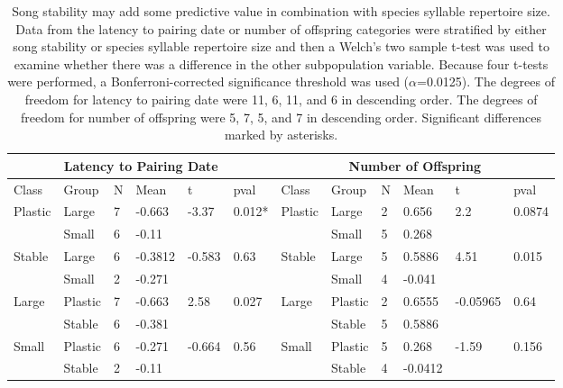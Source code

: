 \documentclass{article}
\begin{document}
\begin{table}[H]
\caption{Song stability may add some predictive value in combination with species syllable repertoire size.  Data from the latency to pairing date or number of offspring categories were stratified by either song stability or species syllable repertoire size and then a Welch's two sample t-test was used to examine whether there was a difference in the other subpopulation variable.  Because four t-tests were performed, a Bonferroni-corrected significance threshold was used ($\alpha$=0.0125).  The degrees of freedom for latency to pairing date were 11, 6, 11, and 6 in descending order.  The degrees of freedom for number of offspring were 5, 7, 5, and 7 in descending order. Significant differences marked by asterisks.}
\centering
\begin{tabular}{|llllll|llllll|}
  \hline
    \multicolumn{6}{|c|}{Latency to Pairing Date} &
  \multicolumn{6}{c|}{Number of Offspring}\\
  \hline
Class & Group & N & Mean & t & pval & Class & Group & N & Mean & t & pval \\ 
  \hline
  Plastic & Large & 7 & -0.663 & -3.37 & 0.012* & Plastic & Large & 2 & 0.656 & 2.2 & 0.0874 \\ 
   & Small & 6 & -0.11 &  &  &  & Small & 5 & 0.268 &  &  \\ 
  Stable & Large & 6 & -0.3812 & -0.583 & 0.63 & Stable & Large & 5 & 0.5886 & 4.51 & 0.015 \\ 
   & Small & 2 & -0.271 &  &  &  & Small & 4 & -0.041 &  &  \\ 
     \hline
  Large & Plastic & 7 & -0.663 & 2.58 & 0.027 & Large & Plastic & 2 & 0.6555 & -0.05965 & 0.64 \\ 
   & Stable & 6 & -0.381 &  &  &  & Stable & 5 & 0.5886 &  &  \\ 
  Small & Plastic & 6 & -0.271 & -0.664 & 0.56 & Small & Plastic & 5 & 0.268 & -1.59 & 0.156 \\ 
   & Stable & 2 & -0.11 &  &  &  & Stable & 4 & -0.0412 &  &  \\ 
   \hline
\end{tabular}
\end{table}
\end{document}
